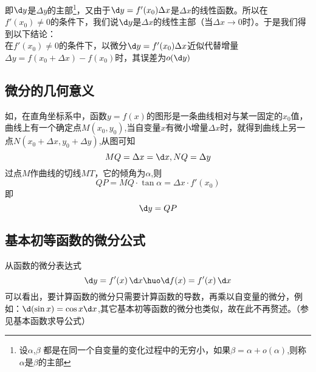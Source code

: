 \kg 即$\d y$是$\Delta y $的主部\footnote{设$\alpha$,$ \beta$ 都是在同一个自变量的变化过程中的无穷小，如果$\beta=\alpha +o(\alpha)$,则称$\alpha$是$\beta$的主部}，又由于$\d y=f'(x_0)\Delta x$是$\Delta x$的线性函数。所以在$f'(x_0)\neq0$的条件下，我们说$\d y$是$\Delta x$的线性主部（当$\Delta x\to 0$时）。于是我们得到以下结论：
\\  \kg 在$f'(x_0)\neq0$的条件下，以微分$\d y=f'(x_0)\Delta x$近似代替增量$\Delta y=f(x_0+\Delta x)-f(x_0)$时，其误差为$o(\d y)$
\subsection{微分的几何意义}
如，在直角坐标系中，函数$y=f(x)$的图形是一条曲线相对与某一固定的$x_0$值，曲线上有一个确定点$M(x_0,y_0)$,当自变量$x$有微小增量$\Delta x$时，就得到曲线上另一点$N(x_0+\Delta x,y_0+\Delta y)$,从图可知
\begin{equation}
	\nonumber
	MQ=\Delta x=\d x,NQ=\Delta y
\end{equation}
过点$M$作曲线的切线$MT$，它的倾角为$\alpha$,则
\begin{equation}
	\nonumber
	QP=MQ\cdot \tan\alpha=\Delta x\cdot f'(x_0)
\end{equation}
即
\begin{equation}
	\nonumber
	\d y=QP
\end{equation}
\subsection{基本初等函数的微分公式}
从函数的微分表达式
\begin{equation}
	\d y=f'(x)\, \d x\huo \d f(x)=f'(x)\, \d x
\end{equation}
\kg 可以看出，要计算函数的微分只需要计算函数的导数，再乘以自变量的微分，例如：$\d(\sin x)=\cos x \d x$,其它基本初等函数的微分也类似，故在此不再赘述。（参见基本函数求导公式）

